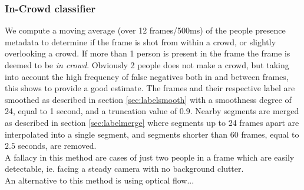 \subsubsection{In-Crowd classifier}\label{sec:incrowd}
%
We compute a moving average (over 12 frames/500ms) of the people presence metadata to determine if the frame is shot from within a crowd, or slightly overlooking a crowd. If more than 1 person is present in the frame the frame is deemed to be \textit{in crowd}. Obviously 2 people does not make a crowd, but taking into account the high frequency of false negatives both in and between frames, this shows to provide a good estimate. The frames and their respective label are smoothed as described in section \ref{sec:labelsmooth} with a smoothness degree of 24, equal to 1 second, and a truncation value of $0.9$. Nearby segments are merged as described in section \ref{sec:labelmerge} where segments up to 24 frames apart are interpolated into a single segment, and segments shorter than 60 frames, equal to $2.5$ seconds, are removed.\\
A fallacy in this method are cases of just two people in a frame which are easily detectable, ie. facing a steady camera with no background clutter.\\
An alternative to this method is using optical flow... %
%
